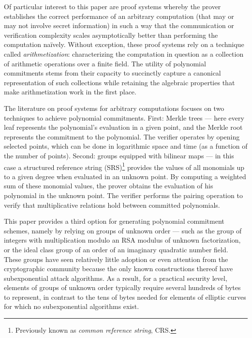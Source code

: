 \documentclass{article}
\begin{document}
Of particular interest to this paper are proof systems whereby the prover establishes the correct performance of an arbitrary computation (that may or may not involve secret information) in such a way that the communication or verification complexity scales asymptotically better than performing the computation naïvely. Without exception, these proof systems rely on a technique called \emph{arithmetization}: characterizing the computation in question as a collection of arithmetic operations over a finite field. The utility of polynomial commitments stems from their capacity to succinctly capture a canonical representation of such collections while retaining the algebraic properties that make arithmetization work in the first place.

The literature on proof systems for arbitrary computations focuses on two techniques to achieve polynomial commitments. First: Merkle trees --- here every leaf represents the polynomial's evaluation in a given point, and the Merkle root represents the commitment to the polynomial. The verifier operates by opening selected points, which can be done in logarithmic space and time (as a function of the number of points). Second: groups equipped with bilinear maps --- in this case a structured reference string (SRS)\footnote{Previously known as \emph{common reference string}, CRS.} provides the values of all monomials up to a given degree when evaluated in an unknown point. By computing a weighted sum of these monomial values, the prover obtains the evaluation of his polynomial in the unknown point. The verifier performs the pairing operation to verify that multiplicative relations hold between committed polynomials.

This paper provides a third option for generating polynomial commitment schemes, namely by relying on groups of unknown order --- such as the group of integers with multiplication modulo an RSA modulus of unknown factorization, or the ideal class group of an order of an imaginary quadratic number field. These groups have seen relatively little adoption or even attention from the cryptographic community because the only known constructions thereof have subexponential attack algorithms. As a result, for a practical security level, elements of groups of unknown order typically require several hundreds of bytes to represent, in contrast to the tens of bytes needed for elements of elliptic curves for which no subexponential algorithms exist. 
\end{document}
